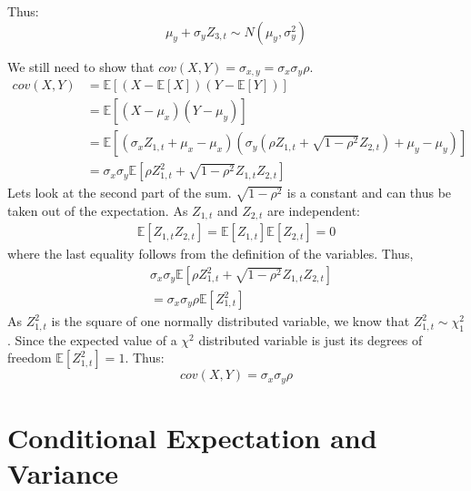 \documentclass[11pt]{article}
\begin{document}
Thus:
\begin{equation}
  \label{eq:6}
  \mu_y + \sigma_y Z_{3,t} \sim N(\mu_y, \sigma^2_y)
\end{equation}

We still need to show that $cov(X,Y) = \sigma_{x,y} = \sigma_x \sigma_y \rho$.
\begin{equation}
  \label{eq:7}
  \begin{split}
    cov(X,Y) &= \mathbb{E}[(X - \mathbb{E}[X])(Y - \mathbb{E}[Y])]\\
    &= \mathbb{E}[(X - \mu_x)(Y-\mu_y)]\\
    &= \mathbb{E}[(\sigma_x Z_{1,t} + \mu_x - \mu_x)(\sigma_y (\rho Z_{1,t} + \sqrt{1-\rho^2} Z_{2,t}) + \mu_y - \mu_y)]\\
    &= \sigma_x \sigma_y \mathbb{E}[\rho Z^2_{1,t} + \sqrt{1-\rho^2}Z_{1,t}Z_{2,t}]
  \end{split}
\end{equation}
Lets look at the second part of the sum. $\sqrt{1-\rho^2}$ is a constant and can thus be taken out of the expectation. As $Z_{1,t}$ and $Z_{2,t}$ are independent:
\begin{equation}
  \label{eq:8}
  \begin{split}
    \mathbb{E}[Z_{1,t}Z_{2,t}] = \mathbb{E}[Z_{1,t}] \mathbb{E}[Z_{2,t}] = 0 
  \end{split}
\end{equation}
where the last equality follows from the definition of the variables.
Thus,
\begin{equation}
  \label{eq:9}
  \begin{split}
  &\sigma_x \sigma_y \mathbb{E}[\rho Z^2_{1,t} + \sqrt{1-\rho^2}Z_{1,t}Z_{2,t}]\\
  &= \sigma_x \sigma_y \rho \mathbb{E}[Z^2_{1,t}]
\end{split}
\end{equation}
As $Z^2_{1,t}$ is the square of one normally distributed variable, we know that $Z^2_{1,t} \sim \chi^2_1$. Since the expected value of a $\chi^2$ distributed variable is just its degrees of freedom $\mathbb{E}[Z^2_{1,t}] = 1$. Thus:
\begin{equation}
  \label{eq:10}
  cov(X,Y) = \sigma_x \sigma_y \rho
\end{equation}

\section{Conditional Expectation and Variance}
\label{sec:cond-expect-vari}
\end{document}
